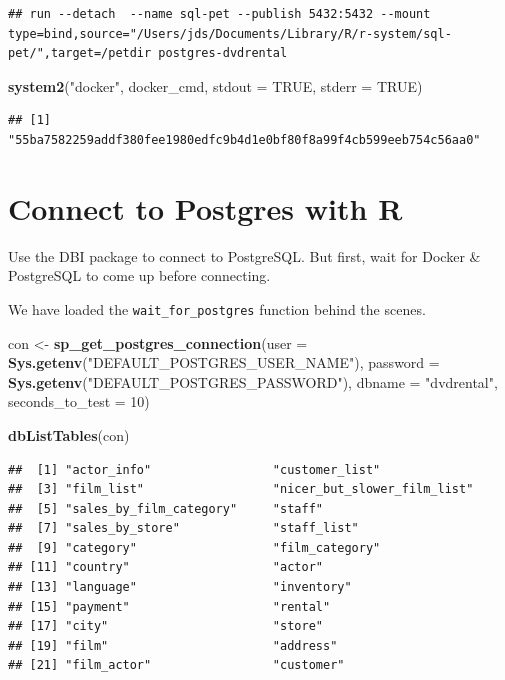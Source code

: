 \documentclass[]{book}
\newenvironment{Shaded}{\begin{snugshade}}{\end{snugshade}}
\newcommand{\DataTypeTok}[1]{\textcolor[rgb]{0.13,0.29,0.53}{#1}}
\newcommand{\DecValTok}[1]{\textcolor[rgb]{0.00,0.00,0.81}{#1}}
\newcommand{\KeywordTok}[1]{\textcolor[rgb]{0.13,0.29,0.53}{\textbf{#1}}}
\newcommand{\NormalTok}[1]{#1}
\newcommand{\OtherTok}[1]{\textcolor[rgb]{0.56,0.35,0.01}{#1}}
\newcommand{\StringTok}[1]{\textcolor[rgb]{0.31,0.60,0.02}{#1}}
\theoremstyle{definition}
\theoremstyle{definition}
\theoremstyle{definition}
\theoremstyle{remark}
\begin{document}
\begin{verbatim}
## run --detach  --name sql-pet --publish 5432:5432 --mount type=bind,source="/Users/jds/Documents/Library/R/r-system/sql-pet/",target=/petdir postgres-dvdrental
\end{verbatim}

\begin{Shaded}
\begin{Highlighting}[]
\KeywordTok{system2}\NormalTok{(}\StringTok{"docker"}\NormalTok{, docker_cmd, }\DataTypeTok{stdout =} \OtherTok{TRUE}\NormalTok{, }\DataTypeTok{stderr =} \OtherTok{TRUE}\NormalTok{)}
\end{Highlighting}
\end{Shaded}

\begin{verbatim}
## [1] "55ba7582259addf380fee1980edfc9b4d1e0bf80f8a99f4cb599eeb754c56aa0"
\end{verbatim}

\hypertarget{connect-to-postgres-with-r}{%
\section{Connect to Postgres with R}\label{connect-to-postgres-with-r}}

Use the DBI package to connect to PostgreSQL. But first, wait for Docker
\& PostgreSQL to come up before connecting.

We have loaded the \texttt{wait\_for\_postgres} function behind the
scenes.

\begin{Shaded}
\begin{Highlighting}[]
\NormalTok{con <-}\StringTok{ }\KeywordTok{sp_get_postgres_connection}\NormalTok{(}\DataTypeTok{user =} \KeywordTok{Sys.getenv}\NormalTok{(}\StringTok{"DEFAULT_POSTGRES_USER_NAME"}\NormalTok{),}
                         \DataTypeTok{password =} \KeywordTok{Sys.getenv}\NormalTok{(}\StringTok{"DEFAULT_POSTGRES_PASSWORD"}\NormalTok{),}
                         \DataTypeTok{dbname =} \StringTok{"dvdrental"}\NormalTok{,}
                         \DataTypeTok{seconds_to_test =} \DecValTok{10}\NormalTok{)}

\KeywordTok{dbListTables}\NormalTok{(con)}
\end{Highlighting}
\end{Shaded}

\begin{verbatim}
##  [1] "actor_info"                 "customer_list"             
##  [3] "film_list"                  "nicer_but_slower_film_list"
##  [5] "sales_by_film_category"     "staff"                     
##  [7] "sales_by_store"             "staff_list"                
##  [9] "category"                   "film_category"             
## [11] "country"                    "actor"                     
## [13] "language"                   "inventory"                 
## [15] "payment"                    "rental"                    
## [17] "city"                       "store"                     
## [19] "film"                       "address"                   
## [21] "film_actor"                 "customer"
\end{verbatim}
\end{document}
